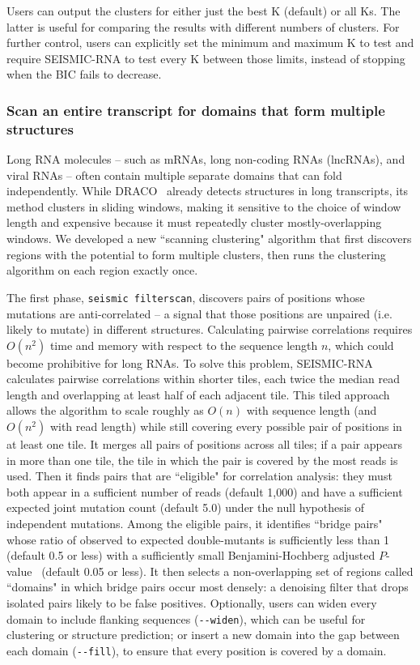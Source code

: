 \documentclass[unnumsec,webpdf,contemporary,large]{oup-authoring-template}%
\theoremstyle{thmstyleone}%
\theoremstyle{thmstyletwo}%
\theoremstyle{thmstylethree}%
\begin{document}
Users can output the clusters for either just the best K (default) or all Ks.
The latter is useful for comparing the results with different numbers of clusters.
For further control, users can explicitly set the minimum and maximum K to test and require SEISMIC-RNA to test every K between those limits, instead of stopping when the BIC fails to decrease.

\subsubsection{Scan an entire transcript for domains that form multiple structures}

Long RNA molecules -- such as mRNAs, long non-coding RNAs (lncRNAs), and viral RNAs -- often contain multiple separate domains that can fold independently.
While DRACO~\cite{Morandi2021} already detects structures in long transcripts, its method clusters in sliding windows, making it sensitive to the choice of window length and expensive because it must repeatedly cluster mostly-overlapping windows.
We developed a new ``scanning clustering" algorithm that first discovers regions with the potential to form multiple clusters, then runs the clustering algorithm on each region exactly once.

The first phase, \verb|seismic filterscan|, discovers pairs of positions whose mutations are anti-correlated -- a signal that those positions are unpaired (i.e. likely to mutate) in different structures.
Calculating pairwise correlations requires $O(n^2)$ time and memory with respect to the sequence length $n$, which could become prohibitive for long RNAs.
To solve this problem, SEISMIC-RNA calculates pairwise correlations within shorter tiles, each twice the median read length and overlapping at least half of each adjacent tile.
This tiled approach allows the algorithm to scale roughly as $O(n)$ with sequence length (and $O(n^2)$ with read length) while still covering every possible pair of positions in at least one tile.
It merges all pairs of positions across all tiles; if a pair appears in more than one tile, the tile in which the pair is covered by the most reads is used.
Then it finds pairs that are ``eligible" for correlation analysis: they must both appear in a sufficient number of reads (default 1,000) and have a sufficient expected joint mutation count (default 5.0) under the null hypothesis of independent mutations.
Among the eligible pairs, it identifies ``bridge pairs" whose ratio of observed to expected double-mutants is sufficiently less than 1 (default 0.5 or less) with a sufficiently small Benjamini-Hochberg adjusted $P$-value~\cite{Benjamini1995} (default 0.05 or less).
It then selects a non-overlapping set of regions called ``domains" in which bridge pairs occur most densely: a denoising filter that drops isolated pairs likely to be false positives.
Optionally, users can widen every domain to include flanking sequences (\verb|--widen|), which can be useful for clustering or structure prediction; or insert a new domain into the gap between each domain (\verb|--fill|), to ensure that every position is covered by a domain.
\end{document}
